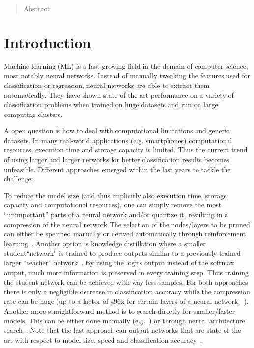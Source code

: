 \documentclass{article}
\begin{document}
\begin{abstract}
Abstract
\end{abstract}




\section{Introduction}
Machine learning (ML) is a fast-growing field in the domain of computer science, most notably neural networks. Instead of manually tweaking the features used for classification or regression, neural networks are able to extract them automatically. They have shown state-of-the-art performance on a variety of classification problems when trained on huge datasets and run on large computing clusters. 

A open question is how to deal with computational limitations and generic datasets. In many real-world applications (e.g. smartphones) computational resources, execution time and storage capacity is limited. Thus the current trend of using larger and larger networks for better classification results becomes unfeasible. Different approaches emerged within the last years to tackle the challenge: 

To reduce the model size (and thus implicitly also execution time, storage capacity and computational resources), one can simply remove the most ``unimportant'' parts of a neural network and/or quantize it, resulting in a compression of the neural network The selection of the nodes/layers to be pruned can either be specified manually or derived automatically through reinforcement learning~\cite{han15,han18}. Another option is knowledge distillation where a smaller student``network'' is trained to produce outputs similar to a previously trained larger ``teacher'' network~\cite{hinton15,phuong19}. By using the logits output instead of the softmax output, much more information is preserved in every training step. Thus training the student network can be achieved with way less samples. For both approaches there is only a negligible decrease in classification accuracy while the compression rate can be huge (up to a factor of 496x for certain layers of a neural network ~\cite{reagan18}). Another more straightforward method is to search directly for smaller/faster models. This can be either done manually (e.g.~\cite{howard17}) or through neural architecture search~\cite{elsken18}. Note that the last approach can output networks that are state of the art with respect to model size, speed and classification accuracy~\cite{tan19}.
\end{document}
